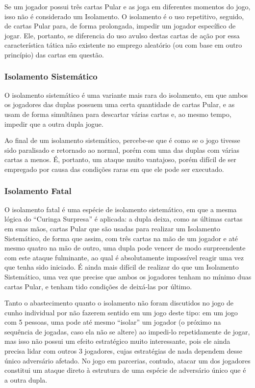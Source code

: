 Se um jogador possui três cartas Pular e as joga em diferentes momentos do jogo, isso não é considerado um Isolamento. O isolamento é o uso repetitivo, seguido, de cartas Pular para, de forma prolongada, impedir um jogador específico de jogar. Ele, portanto, se diferencia do uso avulso destas cartas de ação por essa característica tática não existente no emprego aleatório (ou com base em outro princípio) das cartas em questão.

\subsubsection{Isolamento Sistemático}

O isolamento sistemático é uma variante mais rara do isolamento, em que ambos os jogadores das duplas possuem uma certa quantidade de cartas Pular, e as usam de forma simultânea para descartar várias cartas e, ao mesmo tempo, impedir que a outra dupla jogue.

Ao final de um isolamento sistemático, percebe-se que é como se o jogo tivesse sido paralisado e retornado ao normal, porém com uma das duplas com várias cartas a menos. É, portanto, um ataque muito vantajoso, porém difícil de ser empregado por causa das condições raras em que ele pode ser executado.

\subsubsection{Isolamento Fatal}

O isolamento fatal é uma espécie de isolamento sistemático, em que a mesma lógica do ``Curinga Surpresa'' é aplicada: a dupla deixa, como as últimas cartas em suas mãos, cartas Pular que são usadas para realizar um Isolamento Sistemático, de forma que assim, com três cartas na mão de um jogador e até mesmo quatro na mão de outro, uma dupla pode vencer de modo surpreendente com este ataque fulminante, ao qual é absolutamente impossível reagir uma vez que tenha sido iniciado. É ainda mais difícil de realizar do que um Isolamento Sistemático, uma vez que precise que ambos os jogadores tenham no mínimo duas cartas Pular, e tenham tido condições de deixá-las por último.

Tanto o abastecimento quanto o isolamento não foram discutidos no jogo de cunho individual por não fazerem sentido em um jogo deste tipo: em um jogo com 5 pessoas, uma pode até mesmo ``isolar'' um jogador (o próximo na sequência de jogadas, caso ela não se altere) ao impedi-lo repetidamente de jogar, mas isso não possui um efeito estratégico muito interessante, pois ele ainda precisa lidar com outros 3 jogadores, cujas estratégias de nada dependem desse único adversário afetado. No jogo em parcerias, contudo, atacar um dos jogadores constitui um ataque direto à estrutura de uma espécie de adversário único que é a outra dupla.
